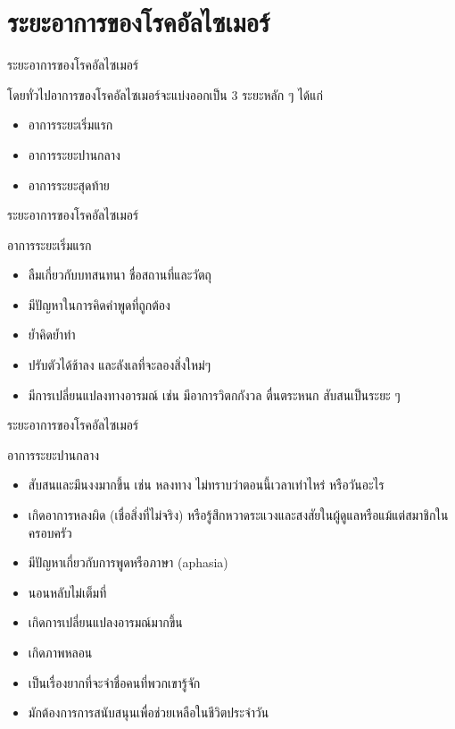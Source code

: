 \documentclass[xetex,serif]{beamer}
\begin{document}
\section{ระยะอาการของโรคอัลไซเมอร์}

\begin{frame}{ระยะอาการของโรคอัลไซเมอร์}

  {\large โดยทั่วไปอาการของโรคอัลไซเมอร์จะแบ่งออกเป็น 3 ระยะหลัก ๆ ได้แก่}

  \begin{itemize}
    \item อาการระยะเริ่มแรก 
    \item อาการระยะปานกลาง 
    \item อาการระยะสุดท้าย 
  \end{itemize}
\end{frame}

\begin{frame}{ระยะอาการของโรคอัลไซเมอร์}

  {\Large อาการระยะเริ่มแรก}

  \begin{itemize}
    \item ลืมเกี่ยวกับบทสนทนา ชื่อสถานที่และวัตถุ 
    \item มีปัญหาในการคิดคำพูดที่ถูกต้อง 
    \item ย้ำคิดย้ำทำ 
    \item ปรับตัวได้ช้าลง และลังเลที่จะลองสิ่งใหม่ๆ 
    \item มีการเปลี่ยนแปลงทางอารมณ์ เช่น มีอาการวิตกกังวล ตื่นตระหนก สับสนเป็นระยะ ๆ
  \end{itemize}
\end{frame}

\begin{frame}{ระยะอาการของโรคอัลไซเมอร์}

  {\Large อาการระยะปานกลาง}

  \begin{itemize}
    \item สับสนและมึนงงมากขึ้น เช่น หลงทาง ไม่ทราบว่าตอนนี้เวลาเท่าไหร่ หรือวันอะไร 
    \item เกิดอาการหลงผิด (เชื่อสิ่งที่ไม่จริง)  หรือรู้สึกหวาดระแวงและสงสัยในผู้ดูแลหรือแม้แต่สมาชิกในครอบครัว 
    \item มีปัญหาเกี่ยวกับการพูดหรือภาษา (aphasia) 
    \item นอนหลับไม่เต็มที่ 
    \item เกิดการเปลี่ยนแปลงอารมณ์มากขึ้น 
    \item เกิดภาพหลอน 
    \item เป็นเรื่องยากที่จะจำชื่อคนที่พวกเขารู้จัก 
    \item มักต้องการการสนับสนุนเพื่อช่วยเหลือในชีวิตประจำวัน
  \end{itemize}
\end{frame}
\end{document}
